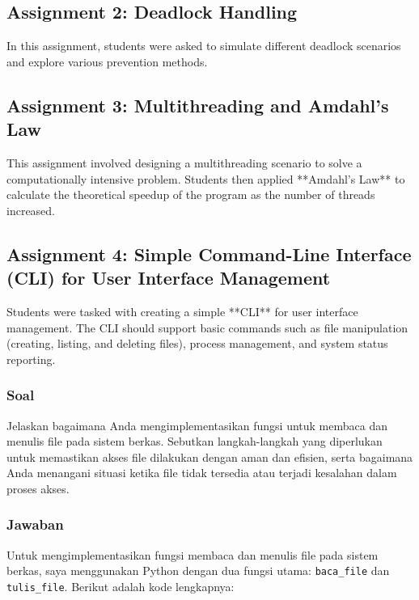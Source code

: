 \documentclass[12pt]{article}
\begin{document}
\subsection{Assignment 2: Deadlock Handling}
In this assignment, students were asked to simulate different deadlock scenarios and explore various prevention methods.

\subsection{Assignment 3: Multithreading and Amdahl's Law}
This assignment involved designing a multithreading scenario to solve a computationally intensive problem. Students then applied **Amdahl's Law** to calculate the theoretical speedup of the program as the number of threads increased.

\subsection{Assignment 4: Simple Command-Line Interface (CLI) for User Interface Management}
Students were tasked with creating a simple **CLI** for user interface management. The CLI should support basic commands such as file manipulation (creating, listing, and deleting files), process management, and system status reporting.

\subsubsection{Soal}

Jelaskan bagaimana Anda mengimplementasikan fungsi untuk membaca dan menulis file pada sistem berkas. Sebutkan langkah-langkah yang diperlukan untuk memastikan akses file dilakukan dengan aman dan efisien, serta bagaimana Anda menangani situasi ketika file tidak tersedia atau terjadi kesalahan dalam proses akses.

\subsubsection{Jawaban}

Untuk mengimplementasikan fungsi membaca dan menulis file pada sistem berkas, saya menggunakan Python dengan dua fungsi utama: \texttt{baca\_file} dan \texttt{tulis\_file}. Berikut adalah kode lengkapnya:
\end{document}
